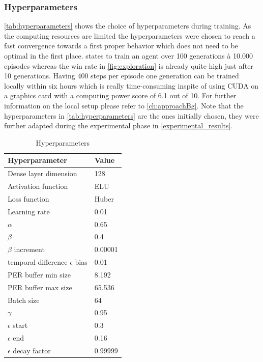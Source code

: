 \subsubsection{Hyperparameters}
\label{ch:approachBe}

\autoref{tab:hyperparameters} shows the choice of hyperparameters during training. As the computing resources are limited the hyperparameters were chosen to reach a fast convergence towards a first proper behavior which does not need to be optimal in the first place. \cite{Kormelink2018} states to train an agent over 100 generations à 10.000 episodes whereas the win rate in \autoref{fig:exploration} is already quite high just after 10 generations. Having 400 steps per episode one generation can be trained locally within six hours which is really time-consuming inspite of using CUDA on a graphics card with a computing power score of 6.1 out of 10. For further information on the local setup please refer to \autoref{ch:approachBg}. Note that the hyperparameters in \autoref{tab:hyperparameters} are the ones initially chosen, they were further adapted during the experimental phase in \autoref{experimental_results}.

\begin{table}[hbt!]
	\caption{Hyperparameters}
	\label{tab:hyperparameters}
	\begin{tabular}{p{}|p{}}
		\textbf{Hyperparameter} & \textbf{Value} \\
		\hline
		\hline
		Dense layer dimension & 128 \\
		\hline
		\hline
		Activation function & ELU \\
		Loss function & Huber \\
		Learning rate & 0.01 \\
		\hline
		\hline
		$\alpha$ & 0.65 \\
		$\beta$ & 0.4 \\
		$\beta$ increment & 0.00001 \\
		temporal difference $\epsilon$ bias & 0.01 \\
		\hline
		\hline
		PER buffer min size & 8.192 \\
		PER buffer max size & 65.536 \\
		Batch size & 64 \\
		\hline
		\hline
		$\gamma$ & 0.95 \\
		$\epsilon$ start & 0.3 \\
		$\epsilon$ end & 0.16 \\
		$\epsilon$ decay factor & 0.99999 \\
	\end{tabular}
\end{table}

